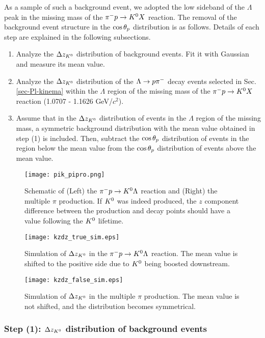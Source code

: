 As a sample of such a background event, we adopted the low sideband of the $\Lambda$ peak in the missing mass of the $\pi^- p \to K^0 X$ reaction. The removal of the background event structure in the $\cos{\theta_p}$ distribution is as follows. Details of each step are explained in the following subsections. 

\begin{enumerate}
  \item Analyze the $\Delta z_{K^{0}}$ distribution of background events. Fit it with Gaussian and measure its mean value.
  \item Analyze the $\Delta z_{K^{0}}$ distribution of the $\Lambda\to p\pi^{-}$ decay events selected in Sec. \ref{sec-Pl-kinema} within the $\Lambda$ region of the missing mass of the $\pi^- p \to K^0 X$ reaction (1.0707 - 1.1626 GeV/$c^{2}$).
  \item Assume that in the $\Delta z_{K^{0}}$ distribution of events in the $\Lambda$ region of the missing mass, a symmetric background distribution with the mean value obtained in step (1) is included. Then, subtract the $\cos{\theta_p}$ distribution of events in the region below the mean value from the $\cos{\theta_p}$ distribution of events above the mean value.
\end{enumerate}

\begin{figure}[h]
  \centering
  \texttt{[image: pik\_pipro.png]}
  \caption{Schematic of (Left) the $\pi^- p \to K^0 \Lambda$ reaction and (Right) the multiple $\pi$ production. If $K^{0}$ was indeed produced, the $z$ component difference between the production and decay points should have a value following the $K^{0}$ lifetime.}
  \label{fig-pik_pipro}
\end{figure}
 
\begin{figure}[!h]
    \centering
    \texttt{[image: kzdz\_true\_sim.eps]}
    \caption{Simulation of $\Delta z_{K^{0}}$ in the $\pi^- p \to K^0 \Lambda$ reaction. The mean value is shifted to the positive side due to $K^{0}$ being boosted downstream.}
    \label{fig-kzdz_true_sim}
\end{figure}

\begin{figure}[!h]
    \centering
    \texttt{[image: kzdz\_false\_sim.eps]}
    \caption{Simulation of $\Delta z_{K^{0}}$ in the multiple $\pi$ production. The mean value is not shifted, and the distribution becomes symmetrical.}
    \label{fig-kzdz_false_sim}
\end{figure}


\subsubsection{Step (1): $\Delta z_{K^{0}}$ distribution of background events}

